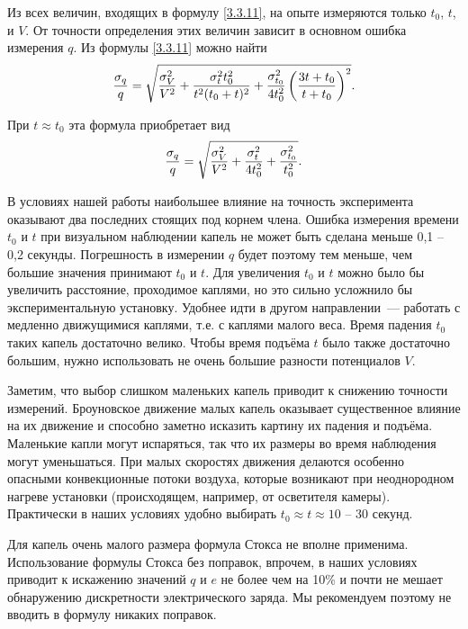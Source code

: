 Из всех величин, входящих в формулу \eqref{3.3.11}, на опыте измеряются только $t_0$, $t$, и $V$. От точности определения этих величин зависит в основном ошибка измерения $q$. Из формулы \eqref{3.3.11} можно найти
\begin{equation}
	\frac{\sigma_q}{q}=\sqrt{\frac{\sigma^2_V}{V^2}+\frac{\sigma^2_t t_0^2}{t^2(t_0+t)^2}+
	\frac{\sigma^2_{t_0}}{4t^2_0}\left(\frac{3t+t_0} {t+t_0}\right)^2}.
	\eqmark{3.3.12}
\end{equation}

При $t\approx t_0$ эта формула приобретает вид
\begin{equation}
	\frac{\sigma_q}{q}=\sqrt{\frac{\sigma^2_V}{V^2}+ \frac{\sigma^2_t}{4t^2_0}+ \frac{\sigma^2_{t_0}}{t^2_0}}.
	\eqmark{3.3.13}
\end{equation}

В условиях нашей работы наибольшее влияние на точность эксперимента оказывают два последних стоящих под корнем члена. Ошибка измерения времени $t_0$ и $t$ при визуальном наблюдении капель не может быть сделана меньше 0,1 -- 0,2 секунды. Погрешность в измерении $q$ будет поэтому тем меньше, чем большие значения принимают $t_0$ и $t$. Для увеличения $t_0$ и $t$ можно было бы увеличить расстояние, проходимое каплями, но это сильно усложнило бы экспериментальную установку. Удобнее идти в другом направлении~--- работать с медленно движущимися каплями, т.е. с каплями малого веса. Время падения $t_0$ таких капель достаточно велико. Чтобы время подъёма $t$ было также достаточно большим, нужно использовать не очень большие разности потенциалов $V$.

Заметим, что выбор слишком маленьких капель приводит к снижению точности измерений. Броуновское движение малых капель оказывает существенное влияние на их движение и способно заметно исказить картину их падения и подъёма. Маленькие капли могут испаряться, так что их размеры во время наблюдения могут уменьшаться. При малых скоростях движения делаются особенно опасными конвекционные потоки воздуха, которые возникают при неоднородном нагреве установки (происходящем, например, от осветителя камеры). Практически в наших условиях удобно выбирать $t_0\approx t\approx 10$ -- 30 секунд.

Для капель очень малого размера формула Стокса не вполне применима. Использование формулы Стокса без поправок, впрочем, в наших условиях приводит к искажению значений $q$ и $e$ не более чем на 10\% и почти не мешает обнаружению дискретности электрического заряда. Мы рекомендуем поэтому не вводить в формулу никаких поправок.

